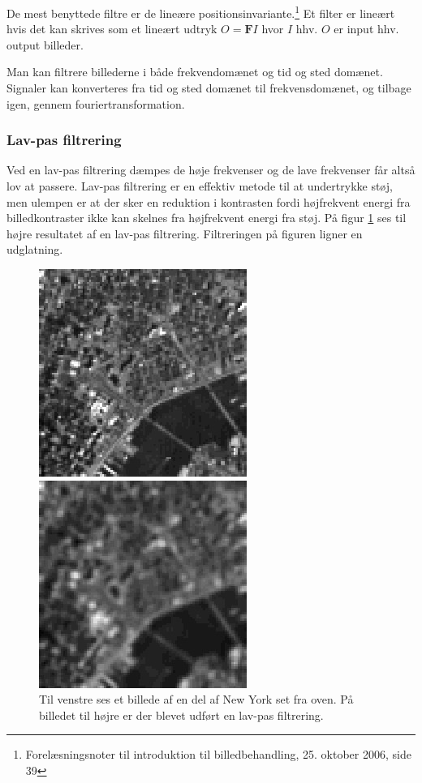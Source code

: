 De mest benyttede filtre er de lineære positionsinvariante.\footnote{Forelæsningsnoter til introduktion til billedbehandling, 25. oktober 2006, side 39} Et filter er lineært hvis det kan skrives som et lineært udtryk $O=\mathbf{F}I$ hvor $I$ hhv. $O$ er input hhv. output billeder. 

Man kan filtrere billederne i både frekvendomænet og tid og sted domænet. Signaler kan konverteres fra tid og sted domænet til frekvensdomænet, og tilbage igen, gennem fouriertransformation.

\subsubsection{Lav-pas filtrering}
Ved en lav-pas filtrering dæmpes de høje frekvenser og de lave frekvenser får altså lov at passere. Lav-pas filtrering er en effektiv metode til at undertrykke støj, men ulempen er at der sker en reduktion i kontrasten fordi højfrekvent energi fra billedkontraster ikke kan skelnes fra højfrekvent energi fra støj. På figur \ref{fig:low_pass} ses til højre resultatet af en lav-pas filtrering. Filtreringen på figuren ligner en udglatning.
\begin{figure}[H]
	\begin{minipage}[b]{0.5\linewidth}
		\centering
		\includegraphics[scale=0.5]{files/bildbeh/img/new_york.jpg}
	\end{minipage}
	\hspace{0.5cm}
	\begin{minipage}[b]{0.5\linewidth}
		\centering
		\includegraphics[scale=0.5]{files/bildbeh/img/lowpass.jpg}
	\end{minipage}
	\caption{Til venstre ses et billede af en del af New York set fra oven. På billedet til højre er der blevet udført en lav-pas filtrering.\label{fig:low_pass}}
\end{figure}


